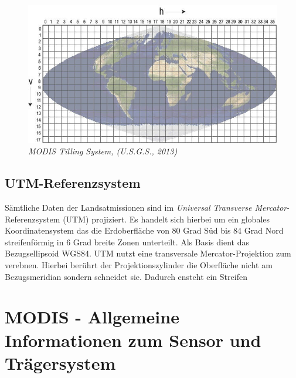 \documentclass[11pt]{report}
\begin{document}
\begin{figure}[H]
\centering
\includegraphics[scale=0.6]{./Grafiken/RefSys/modis_sinusoidal_grid.jpg}
\caption{\textit{MODIS Tilling System, (U.S.G.S., 2013)}}
\end{figure}



\subsection{UTM-Referenzsystem}
Sämtliche Daten der Landsatmissionen sind im \textit{Universal Transverse Mercator}-Referenzsystem (UTM) projiziert. Es handelt sich hierbei um ein globales Koordinatensystem das die Erdoberfläche von 80 Grad Süd bis 84 Grad Nord streifenförmig in 6 Grad breite Zonen unterteilt. Als Basis dient das Bezugsellipsoid WGS84. UTM nutzt eine transversale Mercator-Projektion zum verebnen. Hierbei berührt der Projektionszylinder die Oberfläche nicht am Bezugsmeridian sondern schneidet sie. Dadurch ensteht ein Streifen

\section{MODIS - Allgemeine Informationen zum Sensor und Trägersystem}
\end{document}

